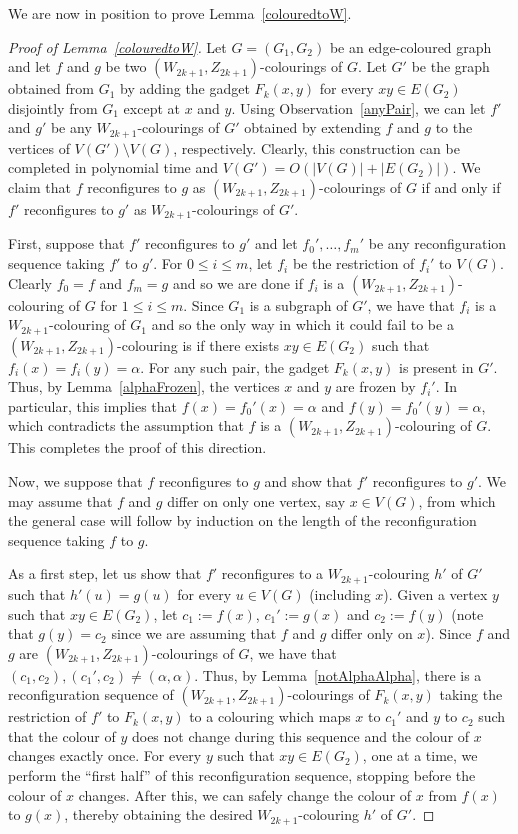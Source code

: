 \documentclass[11 pt]{amsart}
\theoremstyle{definition}
\theoremstyle{case}
\numberwithin{equation}{section}
\begin{document}
We are now in position to prove Lemma~\ref{colouredtoW}.


\begin{proof}[Proof of Lemma~\ref{colouredtoW}]
Let $G=(G_1,G_2)$ be an edge-coloured graph and let $f$ and $g$ be two $(W_{2k+1},Z_{2k+1})$-colourings of $G$. Let $G'$ be the graph obtained from $G_1$ by adding the gadget $F_k(x,y)$ for every $xy\in E(G_2)$ disjointly from $G_1$ except at $x$ and $y$. Using Observation~\ref{anyPair}, we can let $f'$ and $g'$ be any $W_{2k+1}$-colourings of $G'$ obtained by extending $f$ and $g$ to the vertices of $V(G')\setminus V(G)$, respectively. Clearly, this construction can be completed in polynomial time and $V(G')=O\left(|V(G)|+|E(G_2)|\right)$. We claim that $f$ reconfigures to $g$ as $(W_{2k+1},Z_{2k+1})$-colourings of $G$ if and only if $f'$ reconfigures to $g'$ as $W_{2k+1}$-colourings of $G'$. 

First, suppose that $f'$ reconfigures to $g'$ and let $f_0',\dots,f_m'$ be any reconfiguration sequence taking $f'$ to $g'$. For $0\leq i\leq m$, let $f_i$ be the restriction of $f_i'$ to $V(G)$. Clearly $f_0=f$ and $f_m=g$ and so we are done if $f_i$ is a $(W_{2k+1},Z_{2k+1})$-colouring of $G$ for $1\leq i\leq m$. Since $G_1$ is a subgraph of $G'$, we have that $f_i$ is a $W_{2k+1}$-colouring of $G_1$ and so the only way in which it could fail to be a $(W_{2k+1},Z_{2k+1})$-colouring is if there exists $xy\in E(G_2)$ such that $f_i(x)=f_i(y)=\alpha$. For any such pair, the gadget $F_k(x,y)$ is present in $G'$. Thus, by Lemma~\ref{alphaFrozen}, the vertices $x$ and $y$ are frozen by $f_i'$. In particular, this implies that $f(x)=f_0'(x)=\alpha$ and $f(y)=f_0'(y)=\alpha$, which contradicts the assumption that $f$ is a $(W_{2k+1},Z_{2k+1})$-colouring of $G$. This completes the proof of this direction.

Now, we suppose that $f$ reconfigures to $g$ and show that $f'$ reconfigures to $g'$. We may assume that $f$ and $g$ differ on only one vertex, say $x\in V(G)$, from which the general case will follow by induction on the length of the reconfiguration sequence taking $f$ to $g$. 

As a first step, let us show that $f'$ reconfigures to a $W_{2k+1}$-colouring $h'$ of $G'$ such that $h'(u)=g(u)$ for every $u\in V(G)$ (including $x$). Given a vertex $y$ such that $xy\in E(G_2)$, let $c_1:=f(x)$, $c_1':=g(x)$ and $c_2:=f(y)$ (note that $g(y)=c_2$ since we are assuming that $f$ and $g$ differ only on $x$). Since $f$ and $g$ are $(W_{2k+1},Z_{2k+1})$-colourings of $G$, we have that $(c_1,c_2), (c_1',c_2)\neq (\alpha,\alpha)$. Thus, by Lemma~\ref{notAlphaAlpha}, there is a reconfiguration sequence of $(W_{2k+1},Z_{2k+1})$-colourings of $F_k(x,y)$ taking the restriction of $f'$ to $F_k(x,y)$ to a colouring which maps $x$ to $c_1'$ and $y$ to $c_2$ such that the colour of $y$ does not change during this sequence and the colour of $x$ changes exactly once. For every $y$ such that $xy\in E(G_2)$, one at a time, we perform the ``first half'' of this reconfiguration sequence, stopping before the colour of $x$ changes. After this, we can safely change the colour of $x$ from $f(x)$ to $g(x)$, thereby obtaining the desired $W_{2k+1}$-colouring $h'$ of $G'$. 


\end{proof}
\end{document}
